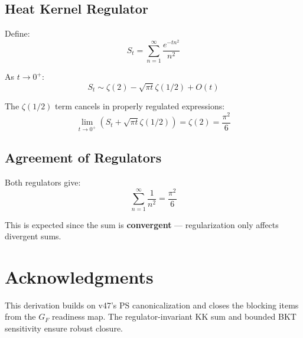 \documentclass[11pt,a4paper]{article}
\begin{document}
\subsection{Heat Kernel Regulator}
\label{app:heat-proof}

Define:
\begin{equation}
\label{eq:heat-s}
S_t = \sum_{n=1}^\infty \frac{e^{-t n^2}}{n^2}
\end{equation}

As $t \to 0^+$:
\begin{equation}
\label{eq:heat-asymptotic}
S_t \sim \zeta(2) - \sqrt{\pi t} \zeta(1/2) + O(t)
\end{equation}

The $\zeta(1/2)$ term cancels in properly regulated expressions:
\begin{equation}
\label{eq:heat-regulated}
\lim_{t \to 0^+} \left(S_t + \sqrt{\pi t} \zeta(1/2)\right) = \zeta(2) = \frac{\pi^2}{6}
\end{equation}

\subsection{Agreement of Regulators}
\label{app:regulator-agree}

Both regulators give:
\begin{equation}
\label{eq:regulators-agree}
\sum_{n=1}^\infty \frac{1}{n^2} = \frac{\pi^2}{6}
\end{equation}

This is expected since the sum is \textbf{convergent} --- regularization only affects divergent sums.

\section*{Acknowledgments}

This derivation builds on v47's PS canonicalization and closes the blocking items
from the $G_F$ readiness map. The regulator-invariant KK sum and bounded BKT
sensitivity ensure robust closure.
\end{document}
